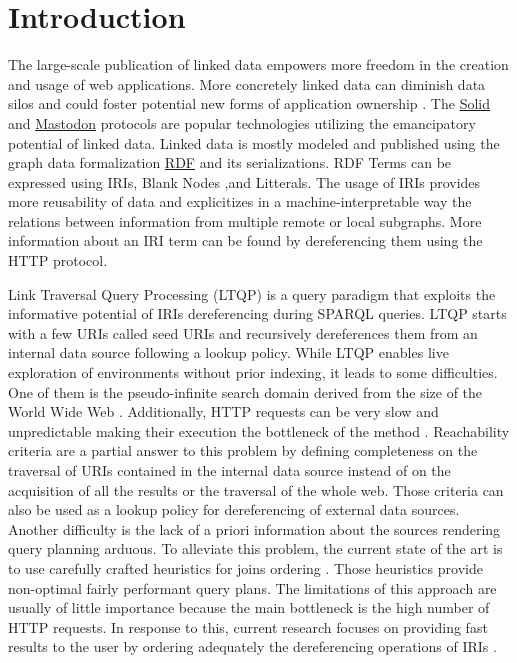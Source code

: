 
\section{Introduction}
 
The large-scale publication of linked data empowers more freedom in the creation and usage of web applications.
More concretely linked data can diminish data silos \cite{Verstraete2022}
and could foster potential new forms of application ownership \cite{Mechant2021}.
The \href{https://solidproject.org/TR/protocol}{Solid} and
\href{https://docs.joinmastodon.org/}{Mastodon} protocols
are popular technologies utilizing the emancipatory potential of linked data.
Linked data is mostly modeled and published using the graph data formalization \href{https://www.w3.org/TR/rdf12-concepts/}{RDF} and its serializations.
RDF Terms can be expressed using IRIs, Blank Nodes ,and Litterals.
The usage of IRIs provides more reusability of data and explicitizes in a machine-interpretable way the relations between
information from multiple remote or local subgraphs.
More information about an IRI term can be found by dereferencing them using the HTTP protocol.

Link Traversal Query Processing (LTQP) \cite{Hartig2012} is a query paradigm that exploits
the informative potential of IRIs dereferencing during SPARQL queries.
LTQP starts with a few URIs called seed URIs and recursively dereferences them from an internal data source following a lookup policy.
While LTQP enables live exploration of environments without prior indexing, it leads to some difficulties.
One of them is the pseudo-infinite search domain derived from the size of the World Wide Web \cite{Hartig2014}.
Additionally, HTTP requests can be very slow and unpredictable making their execution the bottleneck of the method \cite{hartig2016walking}.
Reachability criteria \cite{Hartig2012} are a partial answer to this problem by defining completeness on the traversal of URIs
contained in the internal data source instead of on the acquisition of all the results or the traversal of the whole web.
Those criteria can also be used as a lookup policy for dereferencing of external data sources.
Another difficulty is the lack of a priori information about the sources rendering query planning arduous.
To alleviate this problem, the current state of the art is to use carefully crafted heuristics for joins ordering \cite{Hartig2011}.
Those heuristics provide non-optimal fairly performant query plans.
The limitations of this approach are usually of little importance because the main bottleneck is the high number of HTTP requests.
In response to this, current research focuses on providing fast results to the user by ordering adequately the dereferencing operations of IRIs \cite{hartig2016walking}.

